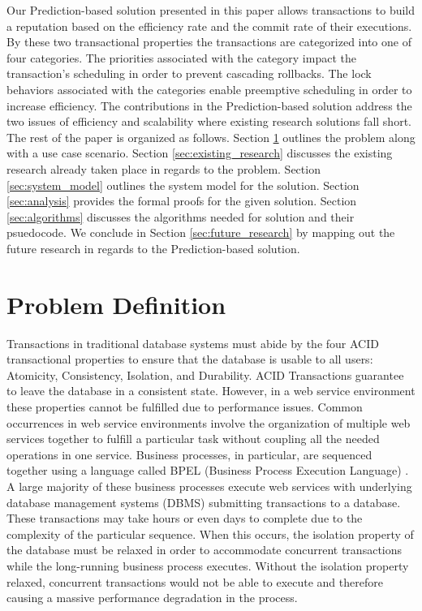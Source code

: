 \documentclass[conference]{IEEEtran}
\begin{document}
Our Prediction-based solution presented in this paper allows transactions to build a reputation based on the efficiency rate and the commit rate of their executions. By these two transactional properties the transactions are categorized into one of four categories. The priorities associated with the category impact the transaction's scheduling in order to prevent cascading rollbacks. The lock behaviors associated with the categories enable preemptive scheduling in order to increase efficiency. The contributions in the Prediction-based solution address the two issues of efficiency and scalability where existing research solutions fall short. The rest of the paper is organized as follows. Section \ref{sec:problem_def} outlines the problem along with a use case scenario. Section \ref{sec:existing_research} discusses the existing research already taken place in regards to the problem. Section \ref{sec:system_model} outlines the system model for the solution. Section \ref{sec:analysis} provides the formal proofs for the given solution. Section \ref{sec:algorithms} discusses the algorithms needed for solution and their psuedocode. We conclude in Section \ref{sec:future_research} by mapping out the future research in regards to the Prediction-based solution.

\section{Problem Definition}
\label{sec:problem_def}
Transactions in traditional database systems must abide by the four ACID transactional properties to ensure that the database is usable to all users: Atomicity, Consistency, Isolation, and Durability. ACID Transactions guarantee to leave the database in a consistent state. However, in a web service environment these properties cannot be fulfilled due to performance issues. Common occurrences in web service environments involve the organization of multiple web services together to fulfill a particular task without coupling all the needed operations in one service. Business processes, in particular, are sequenced together using a language called BPEL (Business Process Execution Language) \cite{BPEL}. A large majority of these business processes execute web services with underlying database management systems (DBMS) submitting transactions to a database. These transactions may take hours or even days to complete due to the complexity of the particular sequence. When this occurs, the isolation property of the database must be relaxed in order to accommodate concurrent transactions while the long-running business process executes. Without the isolation property relaxed, concurrent transactions would not be able to execute and therefore causing a massive performance degradation in the process.
\end{document}
